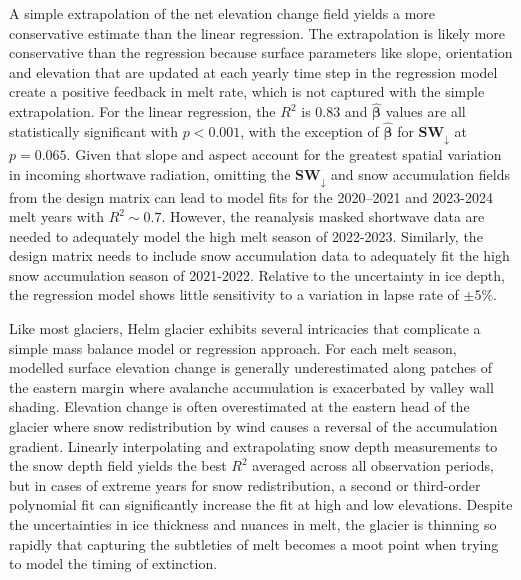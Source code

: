 \documentclass[annals,twocolumn,letterpaper]{igs.cls}
\begin{document}
A simple extrapolation of the net elevation change field yields a more conservative estimate than the linear regression. The extrapolation is likely more conservative than the regression because surface parameters like slope, orientation and elevation that are updated at each yearly time step in the regression model create a positive feedback in melt rate, which is not captured with the simple extrapolation. For the linear regression, the $R^2$ is 0.83 and $\hat{\boldsymbol{\beta}}$ values are all statistically significant with $p<0.001$, with the exception of $\hat{\boldsymbol{\beta}}$ for $\mathbf{SW_{\downarrow}}$ at $p=0.065$. Given that slope and aspect account for the greatest spatial variation in incoming shortwave radiation, omitting the $\mathbf{SW_{\downarrow}}$ and snow accumulation fields from the design matrix can lead to model fits for the  2020--2021 and 2023-2024 melt years with $R^2\sim0.7$. However, the reanalysis masked shortwave data are needed to adequately model the high melt season of 2022-2023. Similarly, the design matrix needs to include snow accumulation data to adequately fit the high snow accumulation season of 2021-2022. Relative to the uncertainty in ice depth, the regression model shows little sensitivity to a variation in lapse rate of $\pm 5\%$.






Like most glaciers, Helm glacier exhibits several intricacies that complicate a simple mass balance model or regression approach. For each melt season, modelled surface elevation change is generally underestimated along patches of the eastern margin where avalanche accumulation is exacerbated by valley wall shading. Elevation change is often overestimated at the eastern head of the glacier where snow redistribution by wind causes a reversal of the accumulation gradient. Linearly interpolating and extrapolating snow depth measurements to the snow depth field yields the best $R^2$ averaged across all observation periods, but in cases of extreme years for snow redistribution, a second or third-order polynomial fit can significantly increase the fit at high and low elevations. Despite the uncertainties in ice thickness and nuances in melt, the glacier is thinning so rapidly that capturing the subtleties of melt becomes a moot point when trying to model the timing of extinction. 
\end{document}
